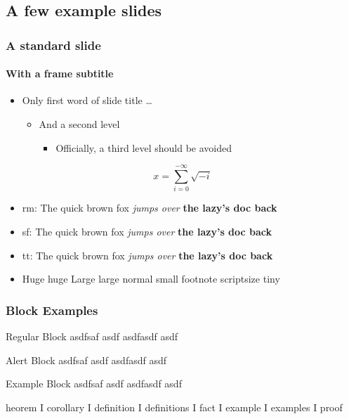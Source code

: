 \documentclass[9pt,aspectratio=169,classification=confidential]{appseceu2017}
\begin{document}
\subsection{A few example slides}
\frame{\sectionpage}
\begin{frame}[classification={confidential}]
  \frametitle{A standard slide}
  \framesubtitle{With a frame subtitle}
  \begin{itemize}
  \item Only first word of slide title \ldots
    \begin{itemize}
    \item  And a second level 
      \begin{itemize}
      \item  Officially, a third level should be avoided
      \end{itemize}
    \end{itemize}
  \end{itemize}
  \[ x = \sum_{i=0}^{-\infty}\sqrt{-i}\]
\begin{itemize}
\item rm: {\rmfamily The quick {\mdseries brown fox} \emph{jumps over} \textbf{the lazy's doc back}}
\item sf: {\sffamily The quick {\mdseries brown fox} \emph{jumps over} \textbf{the lazy's doc back}}
\item tt: {\ttfamily The quick {\mdseries brown fox} \emph{jumps over} \textbf{the lazy's doc back}}
\item {\Huge Huge} {\huge huge} {\Large Large} {\large large} {\normalsize normal} {\small small} 
      {\footnotesize footnote} {\scriptsize scriptsize} {\tiny tiny}
\end{itemize}
\end{frame}

\begin{frame}
\frametitle{Block Examples}
\begin{block}{Regular Block}
asdfsaf asdf asdfasdf asdf 
\end{block}
\begin{alertblock}{Alert Block}
asdfsaf asdf asdfasdf asdf 
\end{alertblock}
\begin{exampleblock}{Example Block}
asdfsaf asdf asdfasdf asdf 
\end{exampleblock}
heorem
I
corollary
I
definition
I
definitions
I
fact
I
example
I
examples
I
proof

\end{frame}
\end{document}
